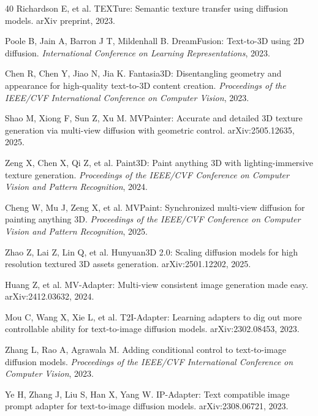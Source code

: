 \documentclass[times,twocolumn,final]{elsarticle}
\providecommand{\DIFadd}[1]{{\protect\color{blue} \sf #1}} %
\providecommand{\DIFaddbegin}{} %
\providecommand{\DIFaddend}{} %
\newcommand{\DIFaddincludegraphics}[2][]{{\color{blue}\fbox{\DIFOincludegraphics[#1]{#2}}}} %
\DeclareRobustCommand{\DIFaddbegin}{\DIFOaddbegin \let\includegraphics\DIFaddincludegraphics} %
\DeclareRobustCommand{\DIFaddend}{\DIFOaddend \let\includegraphics\DIFOincludegraphics} %
\begin{document}
\begin{thebibliography}{40}
Richardson E, et al. TEXTure: Semantic texture transfer using diffusion models. arXiv preprint, 2023.

Poole B, Jain A, Barron J T, Mildenhall B. DreamFusion: Text-to-3D using 2D diffusion. \textit{International Conference on Learning Representations}, 2023.

Chen R, Chen Y, Jiao N, Jia K. Fantasia3D: Disentangling geometry and appearance for high-quality text-to-3D content creation. \textit{Proceedings of the IEEE/CVF International Conference on Computer Vision}, 2023.

\DIFaddbegin {}
\DIFadd{Shao M, Xiong F, Sun Z, Xu M. MVPainter: Accurate and detailed 3D texture generation via multi-view diffusion with geometric control. arXiv:2505.12635, 2025.
}

\DIFadd{Zeng X, Chen X, Qi Z, et al. Paint3D: Paint anything 3D with lighting-immersive texture generation. \textit{Proceedings of the IEEE/CVF Conference on Computer Vision and Pattern Recognition}, 2024.
}

\DIFadd{Cheng W, Mu J, Zeng X, et al. MVPaint: Synchronized multi-view diffusion for painting anything 3D. \textit{Proceedings of the IEEE/CVF Conference on Computer Vision and Pattern Recognition}, 2025.
}

\DIFadd{Zhao Z, Lai Z, Lin Q, et al. Hunyuan3D 2.0: Scaling diffusion models for high resolution textured 3D assets generation. arXiv:2501.12202, 2025.
}

\DIFadd{Huang Z, et al. MV-Adapter: Multi-view consistent image generation made easy. arXiv:2412.03632, 2024.
}

\DIFadd{Mou C, Wang X, Xie L, et al. T2I-Adapter: Learning adapters to dig out more controllable ability for text-to-image diffusion models. arXiv:2302.08453, 2023.
}

\DIFaddend {}
Zhang L, Rao A, Agrawala M. Adding conditional control to text-to-image diffusion models. \textit{Proceedings of the IEEE/CVF International Conference on Computer Vision}, 2023.

Ye H, Zhang J, Liu S, Han X, Yang W. IP-Adapter: Text compatible image prompt adapter for text-to-image diffusion models. arXiv:2308.06721, 2023.


\end{thebibliography}
\end{document}
